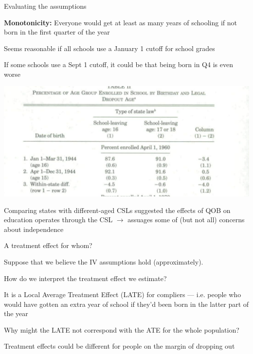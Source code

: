 \documentclass[11pt,english,handout]{beamer}
\newenvironment{wideitemize}{\itemize\addtolength{\itemsep}{10pt}}{\enditemize}
\begin{document}
\begin{frame}{Evaluating the assumptions}
	\begin{wideitemize}
		\item
		\textbf{Monotonicity:} Everyone would get at least as many years of schooling if not born in the first quarter of the year
		
		\pause
		\item
		Seems reasonable if all schools use a January 1 cutoff for school grades
		
		\pause
		\item
		If some schools use a Sept 1 cutoff, it could be that being born in Q4 is even worse
	\end{wideitemize}
\end{frame}


\begin{frame}
	\includegraphics[width = 0.7 \linewidth]{qob-placebo}
	
	\bigskip
	
	\pause
	\begin{wideitemize}
		\item
		Comparing states with different-aged CSLs suggested the effects of QOB on education operates through the CSL $\rightarrow$ assuages some of (but not all) concerns about independence
	\end{wideitemize}
\end{frame}

\begin{frame}{A treatment effect for whom?}
	\begin{wideitemize}
		\item
		Suppose that we believe the IV assumptions hold (approximately).
		
		\item
		How do we interpret the treatment effect we estimate? 
		
		\pause
		\item
		It is a Local Average Treatment Effect (LATE) for compliers --- i.e. people who would have gotten an extra year of school if they'd been born in the latter part of the year
		
		\pause
		\item
		Why might the LATE not correspond with the ATE for the whole population? 
		
			\pause
			\begin{wideitemize}
				\item
				Treatment effects could be different for people on the margin of dropping out
			\end{wideitemize}
	\end{wideitemize}
	
\end{frame}
\end{document}
